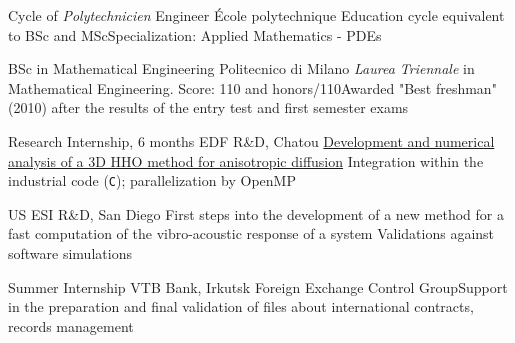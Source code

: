 \documentclass[english]{RMcv}
\begin{document}

%
%
        {Cycle of \textit{Polytechnicien} Engineer}%
        {\'Ecole polytechnique}%
        {Education cycle equivalent to BSc and MSc}{Specialization: Applied Mathematics - PDEs}


%
%
        {BSc in Mathematical Engineering}%
        {Politecnico di Milano}%
        {\emph{Laurea Triennale} in Mathematical Engineering. Score: 110 and honors/110}{Awarded "Best freshman" (2010) after the results of the entry test and first semester exams}


%
%
        {Research Internship, 6 months}%
        {EDF R\&D, Chatou}%
        {\href{https://www.politesi.polimi.it/handle/10589/133692}{Development and numerical analysis of a 3D HHO method for anisotropic diffusion}}%
        {Integration within the industrial code \cs{} (\texttt{C}); parallelization by OpenMP}


%
%
        {US ESI R\&D, San Diego}%
        {First steps into the development of a new method for a fast computation of the vibro-acoustic response of a system}%
        {Validations against software simulations}


%
%
        {Summer Internship}%
        {VTB Bank, Irkutsk}%
        {Foreign Exchange Control Group}{Support in the preparation and final validation of files about international contracts, records management}
\end{document}
